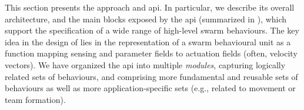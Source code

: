 This section presents the \MacroSwarm{} approach and \ac{api}.
%
In particular, we describe its overall architecture, and the main blocks exposed by the \ac{api}
 (summarized in ), 
 which support the specification of a wide range of high-level swarm behaviours. 
%
The key idea in the design of \MacroSwarm{}  
 lies in the representation of a swarm behavioural unit 
 as a function mapping sensing and parameter fields 
 to actuation fields (often, velocity vectors).
%
We have organized the \ac{api}
 into multiple \emph{modules},
 capturing logically related sets of behaviours,
 and
 comprising more fundamental and reusable sets of behaviours
 as well as more application-specific sets (e.g., related to movement or team formation).
 

